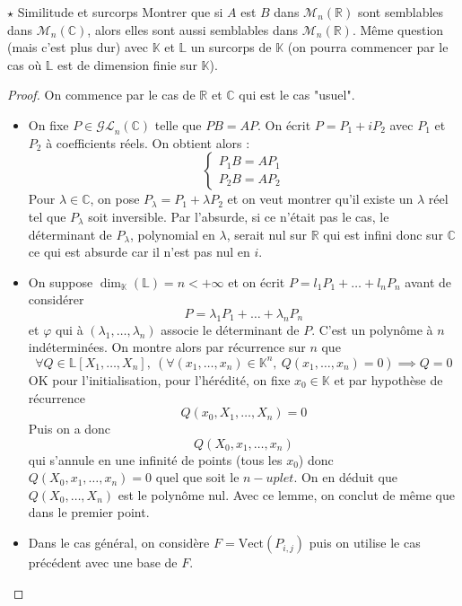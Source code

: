 \documentclass[french,a4paper]{article}
\newcommand{\R}{\mathbb{R}}
\newcommand{\C}{\mathbb{C}}
\newcommand{\K}{\mathbb{K}}
\renewcommand{\L}{\mathbb{L}}
\theoremstyle{plain}
\theoremstyle{definition}
\theoremstyle{remark}
\begin{document}
\begin{ex}{$\star$ Similitude et surcorps}
	Montrer que si $A$ est $B$ dans $\mathcal{M}_n(\R)$ sont semblables dans $\mathcal{M}_n(\C)$, alors elles sont aussi semblables dans $\mathcal{M}_n(\R)$. Même question (mais c'est plus dur) avec $\K$ et $\L$ un surcorps de $\K$ (on pourra commencer par le cas où $\L$ est de dimension finie sur $\K$).
\end{ex}
\begin{proof}
	On commence par le cas de $\R$ et $\C$ qui est le cas "usuel".
	\begin{itemize}
		\item On fixe $P\in\mathcal{GL}_n(\C)$ telle que $PB=AP$. On écrit $P=P_1+iP_2$ avec $P_1$ et $P_2$ à coefficients réels. On obtient alors : $$\begin{cases}
			P_1B=AP_1\\
			P_2B=AP_2
		\end{cases}$$ Pour $\lambda\in\C$, on pose $P_\lambda=P_1+\lambda P_2$ et on veut montrer qu'il existe un $\lambda$ réel tel que $P_\lambda$ soit inversible. Par l'absurde, si ce n'était pas le cas, le déterminant de $P_\lambda$, polynomial en $\lambda$, serait nul sur $\R$ qui est infini donc sur $\C$ ce qui est absurde car il n'est pas nul en $i$.
		\item On suppose $\dim_\K(\L)=n<+\infty$ et on écrit $P=l_1P_1+\ldots+l_nP_n$ avant de considérer $$P=\lambda_1P_1+\ldots+\lambda_nP_n$$ et $\varphi$ qui à $(\lambda_1,\ldots,\lambda_n)$ associe le déterminant de $P$. C'est un polynôme à $n$ indéterminées. On montre alors par récurrence sur $n$ que $$\forall Q\in\L[X_1,\ldots,X_n],\ (\forall(x_1,\ldots,x_n)\in\K^n,\ Q(x_1,\ldots,x_n)=0)\implies Q=0$$ OK pour l'initialisation, pour l'hérédité, on fixe $x_0\in\K$ et par hypothèse de récurrence $$Q(x_0,X_1,\ldots,X_n)=0$$ Puis on a donc $$Q(X_0,x_1,\ldots,x_n)$$ qui s'annule en une infinité de points (tous les $x_0$) donc $Q(X_0,x_1,\ldots,x_n)=0$ quel que soit le $n-uplet$. On en déduit que $Q(X_0,\ldots,X_n)$ est le polynôme nul. Avec ce lemme, on conclut de même que dans le premier point.
		\item Dans le cas général, on considère $F=\text{Vect}(P_{i,j})$ puis on utilise le cas précédent avec une base de $F$.
	\end{itemize}
\end{proof}
\end{document}
